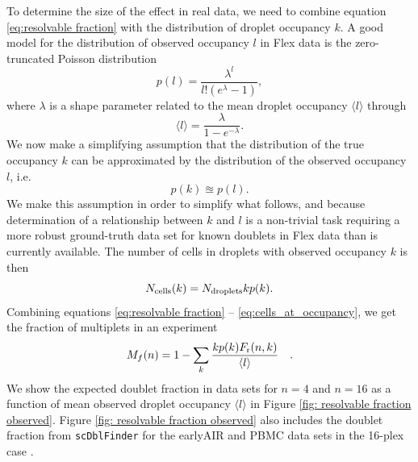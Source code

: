 \documentclass[unnumsec,webpdf,modern,large]{oup-authoring-template}
\begin{document}
	To determine the size of the effect in real data, we need to combine equation \eqref{eq:resolvable fraction} with the distribution of droplet occupancy $k$. 
	A good model for the distribution of observed occupancy $l$ in Flex data is the zero-truncated Poisson distribution
	\begin{equation}
		p(l) = \frac{\lambda^l}{l! (e^{\lambda} - 1)}  ,
		\label{eq: poisson_distribution} 
	\end{equation}
	where $\lambda$ is a shape parameter related to the mean droplet occupancy $\langle l \rangle$ through
	\begin{equation}
		\langle l \rangle = \frac{\lambda}{1 - e^{- \lambda}}  .
		\label{eq: poisson expectation value}
	\end{equation}
	We now make a simplifying assumption that the distribution of the true occupancy $k$ can be approximated by the distribution of the observed occupancy $l$, i.e.
	\begin{equation}
		p(k) \approxeq p(l)  .
		\label{eq:pdf approximation}
	\end{equation}
	We make this assumption in order to simplify what follows, and because determination of a relationship between $k$ and $l$ is a non-trivial task requiring a more robust ground-truth data set for known doublets in Flex data than is currently available. 
	The number of cells in droplets with observed occupancy $k$ is then 
	\begin{equation}
		N_{\rm cells}(k) = N_{\rm droplets} k p(k).
		\label{eq:cells_at_occupancy}
	\end{equation}
	Combining  equations \eqref{eq:resolvable fraction} -- \eqref{eq:cells_at_occupancy}, we get the fraction of multiplets in an experiment 
	\begin{equation}
		M_f(n) = 1 - \sum_k \frac{k p(k) F_{\rm r}(n, k)}{\langle l \rangle} \quad .
		\label{eq:dataset resolvable fraction}
	\end{equation}
	We show the expected doublet fraction in data sets for $n = 4$ and $n = 16$ as a function of mean observed droplet occupancy $\langle l \rangle$ in Figure \ref{fig: resolvable fraction observed}.
	Figure \ref{fig: resolvable fraction observed} also includes the doublet fraction from \texttt{scDblFinder} for the earlyAIR and PBMC data sets in the 16-plex case 
	\citep{Germain2021}.
\end{document}
